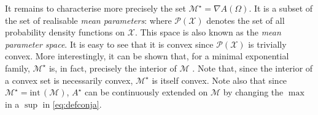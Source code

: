 It remains to characterise more precisely the set $\mathcal M^{\star}=\nabla A(\Omega)$. It is a subset of the set of realisable \emph{mean parameters}:
%
%
where $\mathcal P(\mathcal X)$ denotes the set of all probability density functions on $\mathcal X$. This space is also known as the \emph{mean parameter space}. It is easy to see that it is convex since $\mathcal P(\mathcal X)$ is trivially convex. More interestingly, it can be shown that, for a minimal exponential family, $\mathcal M^{\star}$ is, in fact, precisely the interior of $\mathcal M$ \citep[theorem 3.3]{wainwright08}. Note that, since the interior of a convex set is necessarily convex, $\mathcal M^{\star}$ is itself convex. Note also that since $\mathcal M^{\star}=\mathrm{int}\,(\mathcal M)$, $A^{\star}$ can be continuously extended on $\mathcal M$ by changing the $\max$ in a $\sup$ in \eqref{eq:defconja}. 
%

%

